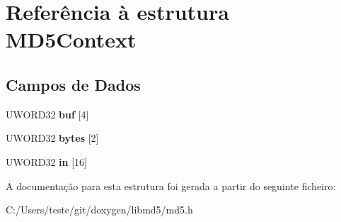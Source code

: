 \hypertarget{struct_m_d5_context}{\section{Referência à estrutura M\-D5\-Context}
\label{struct_m_d5_context}
}
\subsection*{Campos de Dados}
\begin{DoxyCompactItemize}
\item 
\hypertarget{struct_m_d5_context_a457f60cd269808b7362913ec365ae345}{U\-W\-O\-R\-D32 {\bfseries buf} \mbox{[}4\mbox{]}}\label{struct_m_d5_context_a457f60cd269808b7362913ec365ae345}

\item 
\hypertarget{struct_m_d5_context_ac633e12d30e4ae171f62c4f19412dbb2}{U\-W\-O\-R\-D32 {\bfseries bytes} \mbox{[}2\mbox{]}}\label{struct_m_d5_context_ac633e12d30e4ae171f62c4f19412dbb2}

\item 
\hypertarget{struct_m_d5_context_a9078df8e72d87921b600f0bb1db3eae2}{U\-W\-O\-R\-D32 {\bfseries in} \mbox{[}16\mbox{]}}\label{struct_m_d5_context_a9078df8e72d87921b600f0bb1db3eae2}

\end{DoxyCompactItemize}


A documentação para esta estrutura foi gerada a partir do seguinte ficheiro\-:\begin{DoxyCompactItemize}
\item 
C\-:/\-Users/teste/git/doxygen/libmd5/md5.\-h\end{DoxyCompactItemize}
